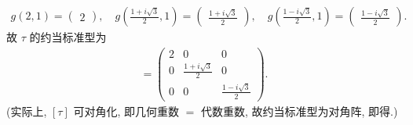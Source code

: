 \documentclass{assignment}
\begin{document}
\begin{sol}
\begin{itemize}
        \begin{align}
            g(2,1)=\begin{pmatrix}
                2
            \end{pmatrix},\quad g\left(\frac{1+i\sqrt{3}}{2},1\right)=\begin{pmatrix}
                \frac{1+i\sqrt{3}}{2}
            \end{pmatrix},\quad g\left(\frac{1-i\sqrt{3}}{2},1\right)=\begin{pmatrix}
                \frac{1-i\sqrt{3}}{2}
            \end{pmatrix}.
        \end{align}
        故 $\tau$ 的约当标准型为
        \begin{align}
            [\tau]=\begin{pmatrix}
                2&0&0\\
                0&\frac{1+i\sqrt{3}}{2}&0\\
                0&0&\frac{1-i\sqrt{3}}{2}
            \end{pmatrix}.
        \end{align}
        (实际上, $[\tau]$ 可对角化, 即几何重数 $=$ 代数重数, 故约当标准型为对角阵, 即得.)
    \end{itemize}
\end{sol}
\end{document}
